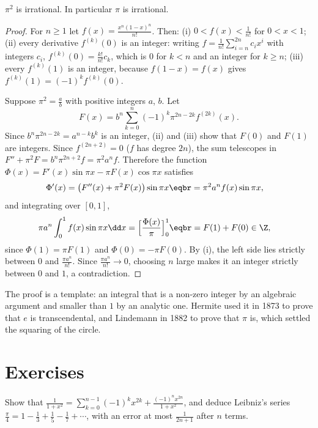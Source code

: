 \begin{theorem}\label{thm:piirrational}
$\pi^2$ is irrational. In particular $\pi$ is irrational.
\end{theorem}
\begin{proof}
For $n\ge1$ let $f(x)=\frac{x^n(1-x)^n}{n!}$. Then:
(i) $0<f(x)<\frac1{n!}$ for $0<x<1$;
(ii) every derivative $f^{(k)}(0)$ is an integer: writing $f=\frac1{n!}\sum_{i=n}^{2n}c_ix^i$ with integers $c_i$,
$f^{(k)}(0)=\frac{k!}{n!}c_k$, which is $0$ for $k<n$ and an integer for $k\ge n$;
(iii) every $f^{(k)}(1)$ is an integer, because $f(1-x)=f(x)$ gives $f^{(k)}(1)=(-1)^kf^{(k)}(0)$.

Suppose $\pi^2=\frac ab$ with positive integers $a$, $b$. Let
\[
F(x)=b^n\sum_{k=0}^n(-1)^k\pi^{2n-2k}f^{(2k)}(x).
\]
Since $b^n\pi^{2n-2k}=a^{n-k}b^k$ is an integer, (ii) and (iii) show that $F(0)$ and $F(1)$ are integers. Since $f^{(2n+2)}=0$
($f$ has degree $2n$), the sum telescopes in $F''+\pi^2F=b^n\pi^{2n+2}f=\pi^2a^nf$. Therefore the function $\Phi(x)=F'(x)\sin\pi x-\pi F(x)\cos\pi x$ satisfies
\[
\begin{aligned}\Phi'(x)&=\bigl(F''(x)+\pi^2F(x)\bigr)\sin\pi x\eqbr=\pi^2a^nf(x)\sin\pi x,\end{aligned}
\]
and integrating over $[0,1]$,
\[
\begin{aligned}\pi a^n\int_0^1f(x)\sin\pi x\dd x&=\Bigl[\frac{\Phi(x)}\pi\Bigr]_0^1\eqbr=F(1)+F(0)\in\Z,\end{aligned}
\]
since $\Phi(1)=\pi F(1)$ and $\Phi(0)=-\pi F(0)$. By (i), the left side lies strictly between $0$ and $\frac{\pi a^n}{n!}$. Since $\frac{\pi a^n}{n!}\to0$, choosing $n$ large makes it an
integer strictly between $0$ and $1$, a contradiction.
\end{proof}

The proof is a template: an integral that is a non-zero integer by an algebraic argument and smaller than $1$ by an analytic
one. Hermite used it in 1873 to prove that $e$ is transcendental, and Lindemann in 1882 to prove that $\pi$ is, which
settled the squaring of the circle.

\section{Exercises}

\begin{exercise}[$\star$]\label{ex:leibniz}
Show that $\frac1{1+x^2}=\sum_{k=0}^{n-1}(-1)^kx^{2k}+\frac{(-1)^nx^{2n}}{1+x^2}$, and deduce Leibniz's series
$\frac\pi4=1-\frac13+\frac15-\frac17+\cdots$, with an error at most $\frac1{2n+1}$ after $n$ terms.
\end{exercise}

